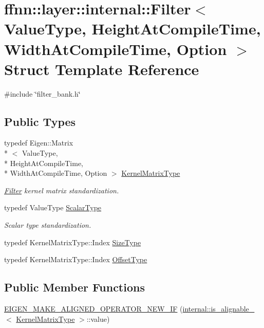 \hypertarget{structffnn_1_1layer_1_1internal_1_1_filter}{\section{ffnn\-:\-:layer\-:\-:internal\-:\-:Filter$<$ Value\-Type, Height\-At\-Compile\-Time, Width\-At\-Compile\-Time, Option $>$ Struct Template Reference}
\label{structffnn_1_1layer_1_1internal_1_1_filter}
}


{\ttfamily \#include \char`\"{}filter\-\_\-bank.\-h\char`\"{}}

\subsection*{Public Types}
\begin{DoxyCompactItemize}
\item 
typedef Eigen\-::\-Matrix\\*
$<$ Value\-Type, \\*
Height\-At\-Compile\-Time, \\*
Width\-At\-Compile\-Time, Option $>$ \hyperlink{structffnn_1_1layer_1_1internal_1_1_filter_a366f3c217c51cde60751c95a1fb67c27}{Kernel\-Matrix\-Type}
\begin{DoxyCompactList}\small\item\em \hyperlink{structffnn_1_1layer_1_1internal_1_1_filter}{Filter} kernel matrix standardization. \end{DoxyCompactList}\item 
typedef Value\-Type \hyperlink{structffnn_1_1layer_1_1internal_1_1_filter_a918a7aa5f9b29d645c90dcc34af35f84}{Scalar\-Type}
\begin{DoxyCompactList}\small\item\em Scalar type standardization. \end{DoxyCompactList}\item 
typedef Kernel\-Matrix\-Type\-::\-Index \hyperlink{structffnn_1_1layer_1_1internal_1_1_filter_adaf4459cd0d17e558b5f5f4773bacf97}{Size\-Type}
\item 
typedef Kernel\-Matrix\-Type\-::\-Index \hyperlink{structffnn_1_1layer_1_1internal_1_1_filter_a543008f199d45ea3c353751c78489a4b}{Offset\-Type}
\end{DoxyCompactItemize}
\subsection*{Public Member Functions}
\begin{DoxyCompactItemize}
\item 
\hyperlink{structffnn_1_1layer_1_1internal_1_1_filter_a2c0d28189a7d2de66d082eb873f5b30e}{E\-I\-G\-E\-N\-\_\-\-M\-A\-K\-E\-\_\-\-A\-L\-I\-G\-N\-E\-D\-\_\-\-O\-P\-E\-R\-A\-T\-O\-R\-\_\-\-N\-E\-W\-\_\-\-I\-F} (\hyperlink{structffnn_1_1layer_1_1internal_1_1is__alignable__128}{internal\-::is\-\_\-alignable\-\_}$<$ \hyperlink{structffnn_1_1layer_1_1internal_1_1_filter_a366f3c217c51cde60751c95a1fb67c27}{Kernel\-Matrix\-Type} $>$\-::value)
\end{DoxyCompactItemize}

